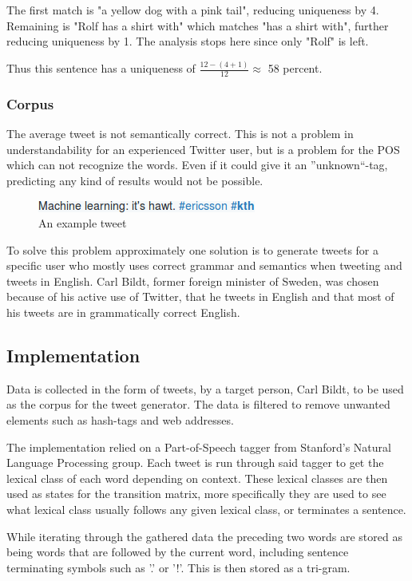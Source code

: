 \documentclass[a4paper,12pt]{article}
\begin{document}
The first match is "a yellow dog with a pink tail", reducing uniqueness by 4. Remaining is "Rolf has a shirt with" which matches "has a shirt with", further reducing uniqueness by 1. The analysis stops here since only "Rolf" is left.

Thus this sentence has a uniqueness of $\frac{12 - (4 + 1)}{12} \approx$ 58 percent.

\subsubsection{Corpus}
The average tweet is not semantically correct. This is not a problem in understandability for an experienced Twitter user,
but is a problem for the POS which can not recognize the words. Even if it could give it an ''unknown``-tag, predicting any kind of results would not be possible.

\begin{figure}[h!]
  \centering
  \includegraphics[width=0.6\linewidth]{machine_learning}
  \caption{An example tweet}
\end{figure}

To solve this problem approximately one solution is to generate tweets for a specific user who mostly uses correct grammar and semantics when tweeting and tweets in English.
Carl Bildt, former foreign minister of Sweden, was chosen because of his active use of Twitter, 
that he tweets in English and that most of his tweets are in grammatically correct English.

\subsection{Implementation}
\label{sec:impl}
Data is collected in the form of tweets, by a target person, Carl Bildt, to be used as the corpus for the tweet generator. The data is filtered to remove unwanted elements such as hash-tags and web addresses.

The implementation relied on a Part-of-Speech tagger from Stanford's Natural Language Processing group. Each tweet is run through said tagger to get the lexical class of each word depending on context.
These lexical classes are then used as states for the transition matrix, more specifically they are used to see what lexical class usually follows any given lexical class, or terminates a sentence.

While iterating through the gathered data the preceding two words are stored as being words that are followed by the current word, including sentence terminating symbols such as '.' or '!'. This is then stored as a tri-gram.
\end{document}
